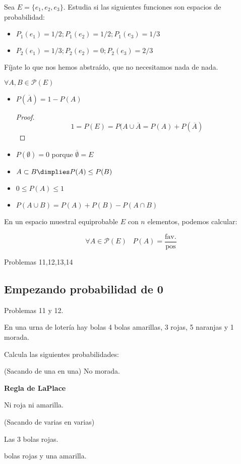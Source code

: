 \begin{example}
Sea $E=\{e_1,e_2,e_3\}$. Estudia si las siguientes funciones son espacios de probabilidad:

\begin{itemize}
	\item $P_1(e_1) = 1/2 ; P_1(e_2) = 1/2 ; P_1(e_3) = 1/3$
	\item $P_2(e_1) = 1/3 ; P_2(e_2) = 0 ; P_2(e_3) = 2/3$
\end{itemize}

\obs Fíjate lo que nos hemos abstraído, que no necesitamos nada de nada. 
\end{example}

\begin{prop}
$\forall A,B \in \mathcal{P}(E)$
\begin{itemize}
	\item $P(\overline{A}) = 1 - P(A)$
	\begin{proof}
		\[1=P(E) = P(A\cup\overline{A} = P(A) + P(\overline{A})\]
	\end{proof}
	\item $P(\emptyset) = 0$ porque $\overline{\emptyset} = E$
	\item $A\subset B \dimplies P(A) \leq P(B)$
	\item $0\leq P(A)\leq 1$
	\item $P(A\cup B) = P(A) + P(B) - P(A\cap B)$
\end{itemize}
\end{prop}

\begin{prop}
En un espacio muestral equiprobable $E$ con $n$ elementos, podemos calcular:

\[\forall A\in \mathcal{P}(E)\;\;\; P(A) = \frac{\text{fav.}}{\text{pos}}\]
\end{prop}

Problemas 11,12,13,14


\subsection{Empezando probabilidad de 0}



Problemas 11 y 12.

\begin{problem}[2]
En una urna de lotería hay bolas 4 bolas amarillas, 3 rojas, 5 naranjas y 1 morada.

Calcula las siguientes probabilidades:

(Sacando de una en una)
\ppart No morada.

\textbf{Regla de LaPlace}

\ppart Ni roja ni amarilla.

(Sacando de varias en varias)

\ppart Las 3 bolas rojas.

 bolas rojas y una amarilla.

\solution
\end{problem}


